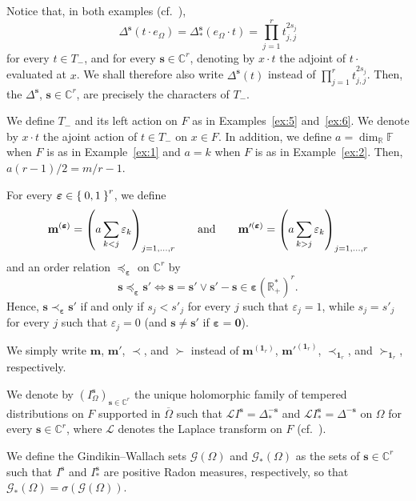\documentclass[10.5pt,reqno]{amsart}
\newcommand{\vect}[1]{\mathbf{{#1}}}
\let\originalleft\left
\let\originalright\right
\renewcommand{\left}{\mathopen{}\mathclose\bgroup\originalleft}
\renewcommand{\right}{\aftergroup\egroup\originalright}
\newcommand{\C}{\mathds{C}}
\newcommand{\R}{\mathds{R}}
\newcommand{\F}{\mathds{F}}
\newcommand{\epsb}{\mathbold{\eps}}
\newcommand{\Gc}{\mathcal{G}}
\newcommand{\Lc}{\mathcal{L}}
\newcommand{\eps}{\varepsilon}
\begin{document}
Notice that, in both examples (cf.~\cite[Proposition VI.3.10]{FarautKoranyi}),
\[
\Delta^{\vect s}(t\cdot e_\Omega)=\Delta^{\vect s}_*(e_{\Omega}\cdot t)=\prod_{j=1}^r t_{j,j}^{2 s_j}
\]
for every $t\in T_-$, and for every $\vect s\in \C^r$, denoting by $x\cdot t$ the adjoint of $t\cdot $ evaluated at $x$. We shall therefore also write $\Delta^{\vect s}(t)$ instead of $\prod_{j=1}^r t_{j,j}^{2 s_j}$. Then, the $\Delta^{\vect s}$, $\vect s\in \C^r$, are precisely the characters of $T_-$. 


\begin{deff}
	We define $T_-$ and its left action on $F$ as in Examples~\ref{ex:5} and~\ref{ex:6}. We denote by $x\cdot t$ the ajoint action of $t\in T_-$ on $x\in F$. In addition, we define $a=\dim_\R \F$ when $F$ is as in Example~\ref{ex:1} and $a=k$ when $F$ is as in Example~\ref{ex:2}. Then, $a(r-1)/2=m/r-1$.
	
	For every $\epsb\in \Set{0,1}^r$, we define
	\[
	\vect m^{(\epsb)}=\left( a\sum_{k<j} \eps_k  \right)_{j=1,\dots, r} \qquad \text{and} \qquad\vect m'^{(\epsb)}=\left( a \sum_{k>j} \eps_k  \right)_{j=1,\dots, r}
	\]
	and an order relation $\preceq_\epsb$ on $\C^r$ by
	\[
	\vect s \preceq_{\epsb} \vect s' \iff \vect s=\vect s' \lor \vect s'-\vect s\in \epsb(\R_+^*)^r.
	\]
	Hence, $\vect s\prec_{\epsb} \vect s'$ if and only if $s_j<s'_j$ for every $j$ such that $\eps_j=1$, while $s_j=s'_j$ for every $j$ such that $\eps_j=0$ (and $\vect s\neq \vect s'$ if $\epsb=\vect 0$).
	
	
	We simply write $\vect m$, $\vect m'$,  $\prec$, and $\succ$ instead of $\vect m^{(\vect 1_r)}$, $\vect m'^{(\vect 1_r)}$,  $\prec_{\vect 1_r}$, and $\succ_{\vect 1_r}$, respectively. 
\end{deff}

\begin{deff}\label{def:1}
We denote by $(I^{\vect s}_\Omega)_{\vect s\in \C^r}$  the unique holomorphic family of tempered distributions on $F$ supported in $\overline \Omega$ such that $\Lc I^{\vect s}=\Delta_{*}^{-\vect s}$ and $\Lc I^{\vect s}_{*}=\Delta^{-\vect s}$ on $\Omega$ for every $\vect s\in \C^r$, where $\Lc$ denotes the Laplace transform on $F$ (cf.~\cite[Proposition 2.28]{CalziPeloso}).  

We define the Gindikin--Wallach sets $\Gc(\Omega)$ and $\Gc_*(\Omega)$ as the sets of $\vect s\in \C^r$ such that $I^{\vect s}$ and $I^{\vect s}_{*}$ are positive Radon measures, respectively, so that $\Gc_*(\Omega)=\sigma(\Gc(\Omega))$.
\end{deff}
\end{document}
